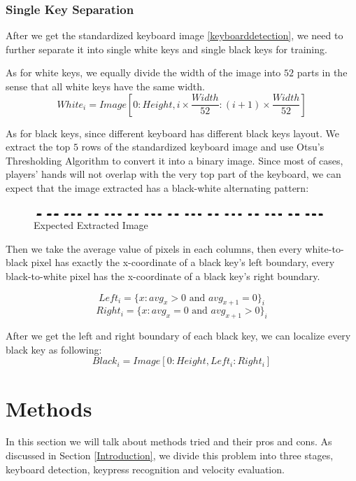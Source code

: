\documentclass[10pt,twocolumn,letterpaper]{article}
\begin{document}
\subsubsection{Single Key Separation} \label{single-key-sep}

After we get the standardized keyboard image \ref{keyboarddetection}, we need to further separate it into single white keys and single black keys for training.

As for white keys, we equally divide the width of the image into \(52\) parts in the sense that all white keys have the same width.
\[White_i = Image[0:Height, i \times \frac{Width}{52}: (i + 1)\times\frac{Width}{52}]\]

As for black keys, since different keyboard has different black keys layout. We extract the top \(5\) rows of the standardized keyboard image and use Otsu's Thresholding Algorithm to convert it into a binary image. Since most of cases, players' hands will not overlap with the very top part of the keyboard, we can expect that the image extracted has a black-white alternating pattern:

\begin{figure}[h!]
   \centering
   \includegraphics[width=\linewidth, height=0.04\linewidth]{fig/17.jpg}
   \caption{Expected Extracted Image}
\end{figure}

Then we take the average value of pixels in each columns, then every white-to-black pixel has exactly the x-coordinate of a black key's left boundary, every black-to-white pixel has the x-coordinate of a black key's right boundary.

\[Left_i = \{x: avg_x > 0 \text{ and } avg_{x + 1} = 0\}_i\]
\[Right_i = \{x: avg_x = 0 \text{ and } avg_{x + 1} > 0\}_i\]

After we get the left and right boundary of each black key, we can localize every black key as following:
\[Black_i = Image[0:Height, Left_i : Right_i]\]


\section{Methods}

In this section we will talk about methods tried and their pros and cons. 
As discussed in Section \ref{Introduction}, we divide this problem into three stages, keyboard detection, keypress recognition and velocity evaluation.
\end{document}
